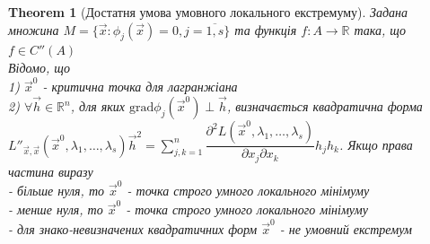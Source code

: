 \documentclass[a4paper, 10pt]{article}
\def\huge{\displaystyle}
\theoremstyle{theoremdd}
\newtheorem{theorem}{Theorem}[subsection]
\theoremstyle{theoremdd}
\theoremstyle{theoremdd}
\theoremstyle{theoremdd}
\theoremstyle{theoremdd}
\theoremstyle{theoremdd}
\theoremstyle{theoremdd}
\theoremstyle{theoremdd}
\theoremstyle{theoremdd}
\begin{document}
\begin{theorem}[Достатня умова умовного локального екстремуму]
Задана множина $M=\{\vec{x}: \phi_j(\vec{x}) =0, j = \overline{1,s} \}$ та функція $f: A \to \mathbb{R}$ така, що $f \in C''(A)$\\
Відомо, що \\
1) $\vec{x}^0$ - критична точка для лагранжіана\\
2) $\forall \vec{h} \in \mathbb{R}^n$, для яких $\textrm{grad} \phi_j(\vec{x}^0) \perp \vec{h}$, визначається квадратична форма\\
$L''_{\vec{x},\vec{x}}(\vec{x}^0, \lambda_1, \dots, \lambda_s) \vec{h}^2 = \huge \sum_{j,k=1}^n \dfrac{\partial^2 L(\vec{x}^0, \lambda_1, \dots, \lambda_s)}{\partial x_j \partial x_k} h_j h_k$. Якщо права частина виразу\\
- більше нуля, то $\vec{x}^0$ - точка строго умного локального мінімуму\\
- менше нуля, то $\vec{x}^0$ - точка строго умного локального мінімуму\\
- для знако-невизначених квадратичних форм $\vec{x}^0$ - не умовний екстремум
\end{theorem}
\end{document}
